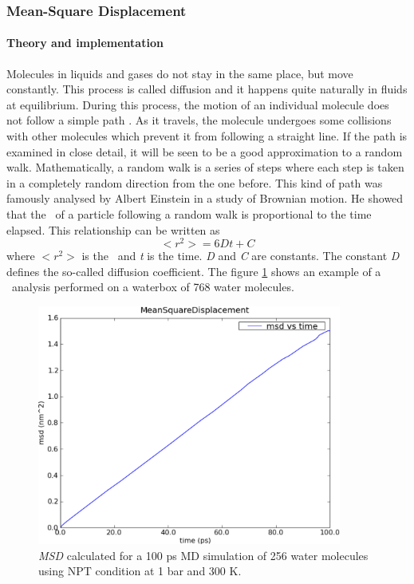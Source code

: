 \documentclass[a4paper,11pt]{report}
\newcommand{\NMOLDYN}{\textit{n}MOLDYN}
\begin{document}
\subsubsection{Mean-Square Displacement}
\label{msd}
\paragraph{Theory and implementation\\}
\label{msd_theory}
Molecules in liquids and gases do not stay in the same place, but move constantly. 
This process is called diffusion and it happens quite naturally in fluids at equilibrium. 
During this process, the motion of an individual molecule does not follow a simple path \cite{Democritus}. 
As it travels, the molecule undergoes some collisions with other molecules which prevent 
it from following a straight line. If the path is examined in close detail, it will be seen 
to be a good approximation to a random walk. Mathematically, a random walk is a series of steps 
where each step is taken in a completely random direction from the one before. 
This kind of path was famously analysed by Albert Einstein in a study of Brownian motion. He showed 
that the \MSD\ of a particle following a random walk is 
proportional to the time elapsed. This relationship can be written as
\begin{equation}
<r^2> = 6Dt + C
\end{equation}
where $<r^2>$ is the \MSD\ and \textit{t} is the time. \textit{D} and \textit{C} are constants. 
The constant \textit{D} defines the so-called diffusion coefficient.
\newpage
The figure \ref{fig:msd_water} shows an example of a \MSD\ analysis performed on a waterbox of 768 water molecules.
\begin{figure}[h!]
\begin{center}
\includegraphics[width=10cm]{Figures/msd_water.eps}
\end{center}
\caption[Examples of calculated \textit{MSD} with \NMOLDYN]{\textit{MSD} calculated for a 100 ps MD simulation of 256 water molecules using NPT condition at 1 bar and 300 K.}
\label{fig:msd_water}
\end{figure}
\end{document}
